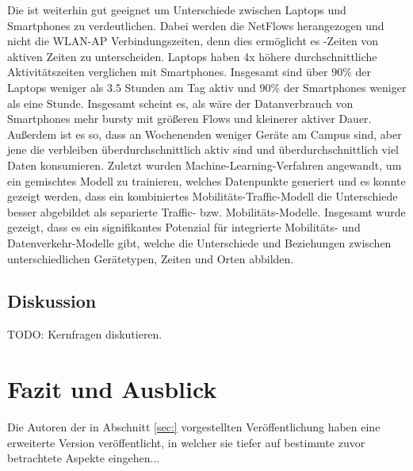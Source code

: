 \documentclass[12pt, a4paper]{article}
\begin{document}
\newline\newline
Die  ist weiterhin gut geeignet um Unterschiede zwischen Laptops und Smartphones zu verdeutlichen.
Dabei werden die NetFlows herangezogen und nicht die WLAN-AP Verbindungszeiten, denn dies ermöglicht es -Zeiten
von aktiven Zeiten zu unterscheiden. Laptops haben 4x höhere durchschnittliche Aktivitätszeiten verglichen mit Smartphones.
Insgesamt sind über $90 \%$ der Laptops weniger als $3.5$ Stunden am Tag aktiv und $90 \%$ der Smartphones weniger als eine Stunde.
\newline\newline
Insgesamt scheint es, als wäre der Datanverbrauch von Smartphones mehr bursty mit größeren Flows und kleinerer aktiver Dauer.
Außerdem ist es so, dass an Wochenenden weniger Geräte am Campus sind, aber jene die verbleiben überdurchschnittlich aktiv sind
und überdurchschnittlich viel Daten konsumieren.
\newline\newline
Zuletzt wurden Machine-Learning-Verfahren angewandt, um ein gemischtes Modell zu trainieren, welches Datenpunkte
generiert und es konnte gezeigt werden, dass ein kombiniertes Mobilitäts-Traffic-Modell die Unterschiede besser abgebildet
als separierte Traffic- bzw. Mobilitäts-Modelle.
\newline\newline
Insgesamt wurde gezeigt, dass es ein signifikantes Potenzial für integrierte Mobilitäts- und Datenverkehr-Modelle gibt,
welche die Unterschiede und Beziehungen zwischen unterschiedlichen Gerätetypen, Zeiten und Orten abbilden.

\subsection{Diskussion}

TODO: Kernfragen diskutieren.

\pagebreak

\section{Fazit und Ausblick}

Die Autoren der in Abschnitt \ref{sec:} vorgestellten Veröffentlichung haben eine erweiterte Version veröffentlicht,
in welcher sie tiefer auf bestimmte zuvor betrachtete Aspekte eingehen...


%

\end{document}

